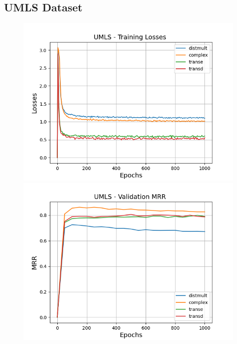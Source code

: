
\subsection{UMLS Dataset}

\begin{figure}
    \centering
    \begin{minipage}{.3\textwidth}
      \centering
      \includegraphics[width=0.9\linewidth]{figures/results/pretrain/umls/pretrain_umls_losses.png}
    \end{minipage}%
    \begin{minipage}{.3\textwidth}
      \centering
      \includegraphics[width=0.9\linewidth]{figures/results/pretrain/umls/pretrain_umls_mrrs.png}
    \end{minipage}
    \begin{minipage}{.3\textwidth}
      \centering

\end{minipage}
\end{figure}
